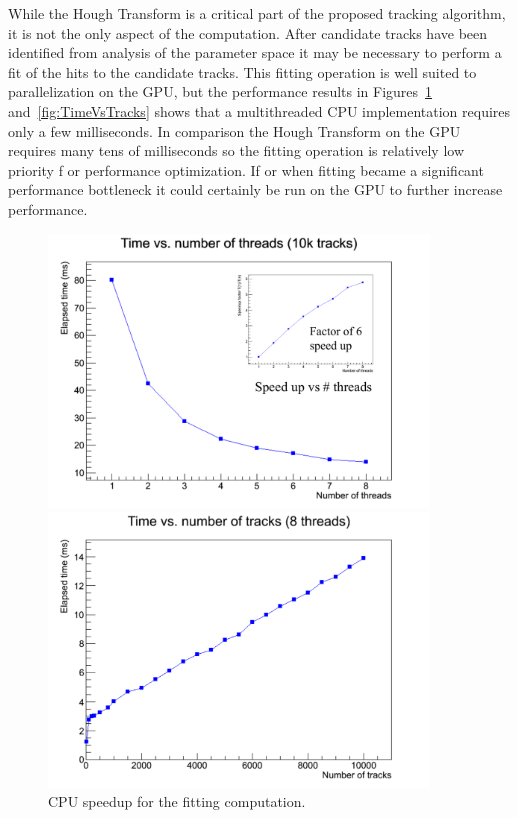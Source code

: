 \documentclass{JINST}
\begin{document}
While the Hough Transform is a critical part of the proposed tracking algorithm, it is not the only aspect of the computation.  After candidate tracks have been 
identified from analysis of the parameter space it may be necessary to perform a fit of the hits to the candidate tracks.  This fitting operation is well suited
 to parallelization on the GPU, but the performance results in Figures~\ref{fig:TimeVsThreads} and~\ref{fig:TimeVsTracks} shows that a multithreaded CPU implementation
 requires only a few milliseconds.  In comparison the Hough Transform on the GPU requires many tens of milliseconds so the fitting operation is relatively low priority f
or performance optimization.  If or when fitting became a significant performance bottleneck it could certainly be run on the GPU to further increase performance.

\begin{figure}[!Hhtb]
\begin{minipage}[t]{8.0cm}
\begin{center}
	\includegraphics[width=0.9\textwidth]{figs/TimeVsThreads.pdf}
	\caption{CPU speedup for the fitting computation. \label{fig:TimeVsThreads}}
	\end{center}
\end{minipage}
\begin{minipage}[t]{8.0cm}
\begin{center}
	\includegraphics[width=0.9\textwidth]{figs/TimeVsTracks.pdf}

\end{center}
\end{minipage}
\end{figure}
\end{document}
